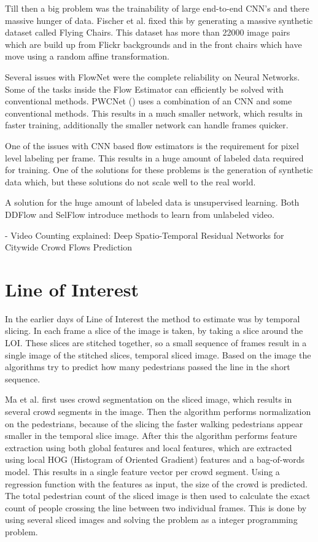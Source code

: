 Till then a big problem was the trainability of large end-to-end CNN's and there massive hunger of data. Fischer et al. fixed this by generating a massive synthetic dataset called Flying Chairs. This dataset has more than 22000 image pairs which are build up from Flickr backgrounds and in the front chairs which have move using a random affine transformation.





Several issues with FlowNet were the complete reliability on Neural Networks. Some of the tasks inside the Flow Estimator can efficiently be solved with conventional methods. PWCNet (\cite{sun_pwc-net_2018}) uses a combination of an CNN and some conventional methods. This results in a much smaller network, which results in faster training, additionally the smaller network can handle frames quicker.

One of the issues with CNN based flow estimators is the requirement for pixel level labeling per frame. This results in a huge amount of labeled data required for training. One of the solutions for these problems is the generation of synthetic data which, but these solutions do not scale well to the real world.

A solution for the huge amount of labeled data is unsupervised learning. Both DDFlow \cite{liu_ddflow_2019} and SelFlow \cite{liu_selflow_2019} introduce methods to learn from unlabeled video.

- Video Counting explained: Deep Spatio-Temporal Residual Networks for Citywide Crowd Flows Prediction


\section{Line of Interest}
In the earlier days of Line of Interest the method to estimate was by temporal slicing. In each frame a slice of the image is taken, by taking a slice around the LOI. These slices are stitched together, so a small sequence of frames result in a single image of the stitched slices, temporal sliced image. Based on the image the algorithms try to predict how many pedestrians passed the line in the short sequence.

Ma et al. \cite{ma_counting_2016} first uses crowd segmentation on the sliced image, which results in several crowd segments in the image. Then the algorithm performs normalization on the pedestrians, because of the slicing the faster walking pedestrians appear smaller in the temporal slice image. After this the algorithm performs feature extraction using both global features and local features, which are extracted using local HOG (Histogram of Oriented Gradient) features and a bag-of-words model. This results in a single feature vector per crowd segment. Using a regression function with the features as input, the size of the crowd is predicted. The total pedestrian count of the sliced image is then used to calculate the exact count of people crossing the line between two individual frames. This is done by using several sliced images and solving the problem as a integer programming problem.

